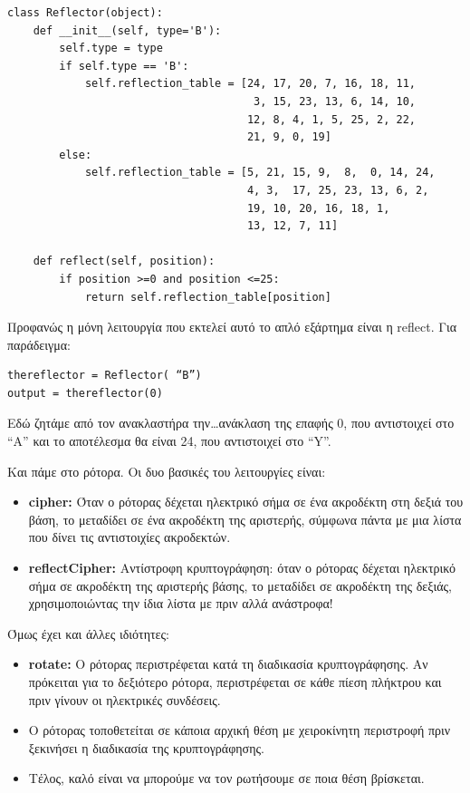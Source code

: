 \documentclass[a4paper,twoside,12pt]{article}
\begin{document}
\begin{verbatim}
class Reflector(object):
    def __init__(self, type='B'):
        self.type = type
        if self.type == 'B':
            self.reflection_table = [24, 17, 20, 7, 16, 18, 11,
                                      3, 15, 23, 13, 6, 14, 10,
                                     12, 8, 4, 1, 5, 25, 2, 22,
                                     21, 9, 0, 19]
        else:
            self.reflection_table = [5, 21, 15, 9,  8,  0, 14, 24,
                                     4, 3,  17, 25, 23, 13, 6, 2,
                                     19, 10, 20, 16, 18, 1,
                                     13, 12, 7, 11] 
                
    def reflect(self, position):
        if position >=0 and position <=25:
            return self.reflection_table[position]
\end{verbatim}

Προφανώς η μόνη λειτουργία που εκτελεί αυτό το απλό εξάρτημα είναι η reflect. Για παράδειγμα:

\begin{verbatim}
thereflector = Reflector( “B”)
output = thereflector(0)
\end{verbatim}

Εδώ ζητάμε από τον ανακλαστήρα την\ldots ανάκλαση της επαφής 0, που αντιστοιχεί στο “Α” και το αποτέλεσμα θα είναι 24, που αντιστοιχεί στο “Y”.

Και πάμε στο ρότορα. Οι δυο βασικές του λειτουργίες είναι:

\begin{itemize}
\item \textbf{cipher:} Όταν ο ρότορας δέχεται ηλεκτρικό σήμα σε ένα ακροδέκτη στη δεξιά του βάση, το μεταδίδει σε ένα ακροδέκτη της αριστερής, σύμφωνα πάντα με μια λίστα που δίνει τις αντιστοιχίες ακροδεκτών.

\item \textbf{reflectCipher:} Αντίστροφη κρυπτογράφηση: όταν ο ρότορας δέχεται ηλεκτρικό σήμα σε ακροδέκτη της αριστερής βάσης, το μεταδίδει σε ακροδέκτη της δεξιάς, χρησιμοποιώντας την ίδια λίστα με πριν αλλά ανάστροφα!
\end{itemize}

Όμως έχει και άλλες ιδιότητες:

\begin{itemize}
\item \textbf{rotate:} Ο ρότορας περιστρέφεται κατά τη διαδικασία κρυπτογράφησης. Αν πρόκειται για το δεξιότερο ρότορα, περιστρέφεται σε κάθε πίεση πλήκτρου και πριν γίνουν οι ηλεκτρικές συνδέσεις.
\item Ο ρότορας τοποθετείται σε κάποια αρχική θέση με χειροκίνητη περιστροφή πριν ξεκινήσει η διαδικασία της κρυπτογράφησης.
\item Τέλος, καλό είναι να μπορούμε να τον ρωτήσουμε σε ποια θέση βρίσκεται.
\end{itemize}
\end{document}
